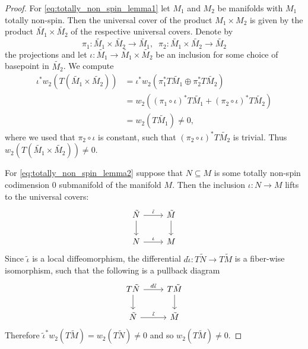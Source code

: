 \begin{proof}%
    For \ref{eq:totally_non_spin_lemma1} let $M_1$ and $M_2$ be manifolds with $M_1$ totally non-spin. Then the universal cover of the product $M_1 \times M_2$ is given by the product $\tilde{M_1} \times \tilde{M_2}$ of the respective universal covers. Denote by 
    \[
    \pi_1 \colon \tilde{M_1} \times \tilde{M_2} \to \tilde{M_1}, \; \;  \pi_2 \colon \tilde{M_1} \times \tilde{M_2} \to \tilde{M_2}
    \]
    the projections and let $\iota \colon \tilde{M_1} \to \tilde{M_1} \times \tilde{M_2}$ be an inclusion for some choice of basepoint in $\tilde{M_2}$. We compute 
    \begin{align*}
    \iota^\ast w_2(T(\tilde{M_1} \times \tilde{M_2})) & = \iota^\ast w_2(\pi_1^\ast T \tilde{M_1} \oplus \pi_2^\ast T \tilde{M_2}) \\
    & = w_2((\pi_1 \circ \iota)^\ast T\tilde{M_1} + (\pi_2 \circ \iota)^\ast T\tilde{M_2} ) \\
    & = w_2(T \tilde{M_1}) \neq 0,
    \end{align*}
    where we used that $\pi_2 \circ \iota$ is constant, such that $(\pi_2 \circ \iota)^\ast T\tilde{M_2}$ is trivial. Thus $w_2(T(\tilde{M_1} \times \tilde{M_2})) \neq 0$.

    For \ref{eq:totally_non_spin_lemma2} suppose that $N \subseteq M$ is some totally non-spin codimension $0$ submanifold of the manifold $M$. Then the inclusion $\iota \colon N \to M$ lifts to the universal covers:
    \[\begin{tikzcd}
	{\tilde{N}} & {\tilde{M}} \\
	N & M
	\arrow["{\tilde{\iota}}", from=1-1, to=1-2]
	\arrow[from=1-1, to=2-1]
	\arrow[from=1-2, to=2-2]
	\arrow["\iota", from=2-1, to=2-2]
    \end{tikzcd}\]
    Since $\tilde{\iota}$ is a local diffeomorphism, the differential $d \tilde{\iota} \colon T\tilde{N} \to T\tilde{M}$ is a fiber-wise isomorphism, such that the following is a pullback diagram
    \[\begin{tikzcd}
	{T\tilde{N}} & {T\tilde{M}} \\
	{\tilde{N}} & {\tilde{M}}
	\arrow["{d \tilde{\iota}}", from=1-1, to=1-2]
	\arrow[from=1-1, to=2-1]
	\arrow[from=1-2, to=2-2]
	\arrow["{\tilde{\iota}}", from=2-1, to=2-2]
    \end{tikzcd}\]
    Therefore $\tilde{\iota}^\ast w_2(T\tilde{M}) = w_2(T\tilde{N}) \neq 0$ and so $w_2(T\tilde{M}) \neq 0$.


\end{proof}
